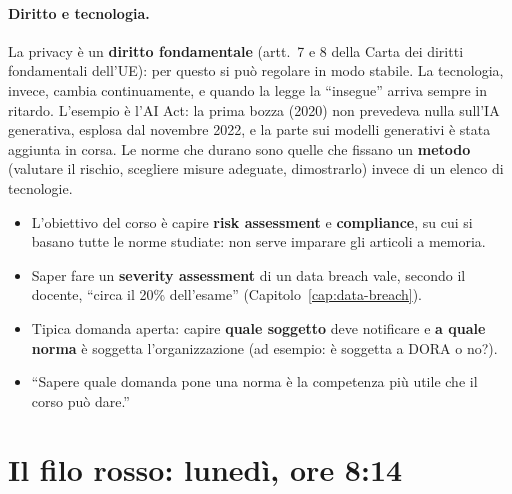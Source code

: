 \paragraph{Diritto e tecnologia.} La privacy è un \textbf{diritto fondamentale} (artt.~7 e 8 della Carta
dei diritti fondamentali dell'UE): per questo si può regolare in modo stabile. La tecnologia, invece,
cambia continuamente, e quando la legge la ``insegue'' arriva sempre in ritardo. L'esempio è l'AI Act:
la prima bozza (2020) non prevedeva nulla sull'IA generativa, esplosa dal novembre 2022, e la parte sui
modelli generativi è stata aggiunta in corsa. Le norme che durano sono quelle che fissano un
\textbf{metodo} (valutare il rischio, scegliere misure adeguate, dimostrarlo) invece di un elenco di
tecnologie.

\begin{esame}
\begin{itemize}
  \item L'obiettivo del corso è capire \textbf{risk assessment} e \textbf{compliance}, su cui si
    basano tutte le norme studiate: non serve imparare gli articoli a memoria.
  \item Saper fare un \textbf{severity assessment} di un data breach vale, secondo il docente,
    ``circa il 20\% dell'esame'' (Capitolo~\ref{cap:data-breach}).
  \item Tipica domanda aperta: capire \textbf{quale soggetto} deve notificare e \textbf{a quale norma}
    è soggetta l'organizzazione (ad esempio: è soggetta a DORA o no?).
  \item ``Sapere quale domanda pone una norma è la competenza più utile che il corso può dare.''
\end{itemize}
\end{esame}

\section{Il filo rosso: lunedì, ore 8:14}
\label{sec:intro-scenario}

